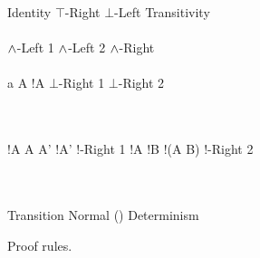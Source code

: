 \begin{FIGURE}
\begin{RULES}

  \ZEROPREMISERULENAMEDRIGHT
  {
    \phi \judge \phi
  }{Identity}
    \quad
  \ZEROPREMISERULENAMEDRIGHT
  {
    \phi \judge \top
  }{$\top$-Right}
    \quad
  \ZEROPREMISERULENAMEDRIGHT
  {
    \bot \judge \phi
  }{$\bot$-Left}
    \quad
  \TWOPREMISERULENAMEDRIGHT
  {
    \phi \judge \psi
  }
  {
    \psi \judge \xi
  }
  {
    \phi \judge \xi
  }{Transitivity}
    \\\\
  \ONEPREMISERULENAMEDRIGHT
  {
    \phi \judge \psi
  }
  {
    \phi \AND \xi \judge \psi
  }{$\land$-Left 1}
     \quad
  \ONEPREMISERULENAMEDRIGHT
  {
    \phi \judge \psi
  }
  {
    \xi \AND \phi  \judge \psi
  }{$\land$-Left 2}
     \quad
  \TWOPREMISERULENAMEDRIGHT
  {
    \phi \judge \psi
  }
  {
    \phi \judge \xi
  }
  {
    \phi \judge \psi \AND \xi
  }{$\land$-Right}
     \\\\
     \ONEPREMISERULENAMEDRIGHT
     {
       a \notin A
     }
     {
       !A \AND {} \judge \bot
     }{$\bot$-Right 1}
        \quad
     \ZEROPREMISERULENAMEDRIGHT
     {
        \judge \bot
     }{$\bot$-Right 2}

     \\\\
     \TWOPREMISERULENAMEDRIGHT
     {
       \phi \judge !A
     }
     {
       A \subseteq A'
     }
     {
       \phi \judge!A'
     }{!-Right 1}
     \quad
     \TWOPREMISERULENAMEDRIGHT
     {
       \phi \judge !A
     }
     {
       \phi \judge !B
     }
     {
       \phi \judge !(A \cap B)
     }{!-Right 2}

     \\\\
     \ONEPREMISERULENAMEDRIGHT
     {
       \phi \judge \psi
     }
     {
        \judge {}
     }{Transition Normal}
     \ONEPREMISERULENAMEDRIGHT
     {
       \phi \judge {}\psi \land {}\xi
     }
     {
       \phi \judge {}(\psi \land \xi)
     }{Determinism}
\end{RULES}
\caption{Proof rules.}\label{figure:elAndBangRules}
\end{FIGURE}
